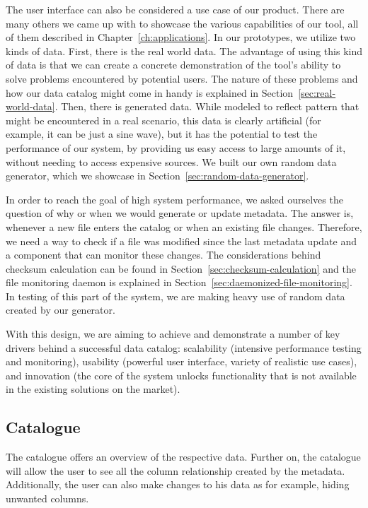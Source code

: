 The user interface can also be considered a use case of our product.
There are many others we came up with to showcase the various capabilities of our tool, all of them described in
Chapter~\ref{ch:applications}.
In our prototypes, we utilize two kinds of data.
First, there is the real world data.
The advantage of using this kind of data is that we can create a concrete demonstration of the tool's ability to solve problems
encountered by potential users.
The nature of these problems and how our data catalog might come in handy is explained in Section~\ref{sec:real-world-data}.
Then, there is generated data.
While modeled to reflect pattern that might be encountered in a real scenario, this data is clearly artificial (for example,
it can be just a sine wave), but it has the potential to test the performance of our system, by providing us easy access
to large amounts of it, without needing to access expensive sources.
We built our own random data generator, which we showcase in Section~\ref{sec:random-data-generator}.

In order to reach the goal of high system performance, we asked ourselves the question of why or when we would generate or
update metadata.
The answer is, whenever a new file enters the catalog or when an existing file changes.
Therefore, we need a way to check if a file was modified since the last metadata update and a component that can monitor
these changes.
The considerations behind checksum calculation can be found in Section~\ref{sec:checksum-calculation} and the file monitoring
daemon is explained in Section~\ref{sec:daemonized-file-monitoring}.
In testing of this part of the system, we are making heavy use of random data created by our generator.

With this design, we are aiming to achieve and demonstrate a number of key drivers behind a successful data catalog: scalability
(intensive performance testing and monitoring), usability (powerful user interface, variety of realistic use cases), and
innovation (the core of the system unlocks functionality that is not available in the existing solutions on the market).

\vspace{5mm} %
\subsection{Catalogue}
The catalogue offers an overview of the respective data. Further on, the catalogue will allow the user to see all the column relationship created by the metadata. Additionally, the user can also make changes to his data as for example, hiding unwanted columns.
\vspace{5mm} %
